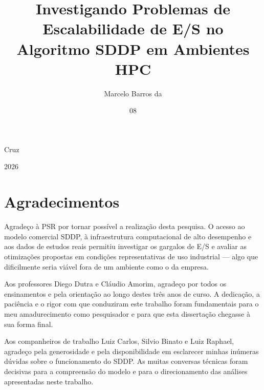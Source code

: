 \documentclass[msc]{coppe}
\begin{document}
  \title{Investigando Problemas de Escalabilidade de E/S no Algoritmo SDDP em Ambientes HPC}
  \author{Marcelo Barros da}{Cruz}
  \date{08}{2026}


  \maketitle

  \frontmatter

  \dedication{Dedico este trabalho à minha esposa e à minha filha,
  pela paciência e compreensão com o tempo que dediquei à pesquisa
  nos finais de semana.}

  \chapter*{Agradecimentos}

  Agradeço à PSR por tornar possível a realização desta pesquisa. O
  acesso ao modelo comercial SDDP, à infraestrutura computacional de
  alto desempenho e aos dados de estudos reais permitiu investigar os
  gargalos de E/S e avaliar as otimizações propostas em condições
  representativas de uso industrial --- algo que dificilmente seria
  viável fora de um ambiente como o da empresa.

  Aos professores Diego Dutra e Cláudio Amorim, agradeço por todos os
  ensinamentos e pela orientação ao longo destes três anos de curso. A
  dedicação, a paciência e o rigor com que conduziram este trabalho
  foram fundamentais para o meu amadurecimento como pesquisador e para
  que esta dissertação chegasse à sua forma final.

  Aos companheiros de trabalho Luiz Carlos, Silvio Binato e Luiz
  Raphael, agradeço pela generosidade e pela disponibilidade em
  esclarecer minhas inúmeras dúvidas sobre o funcionamento do SDDP. As
  muitas conversas técnicas foram decisivas para a compreensão do
  modelo e para o direcionamento das análises apresentadas neste
  trabalho.
\end{document}
